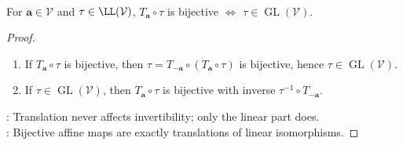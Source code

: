 \begin{corollary} \label{cor:affine-map-bijective-linear-part} \\
For $\mathbf{a}\in\mathcal{V}$ and $\tau\in\LL(\mathcal{V})$, $T_{\mathbf{a}}\circ\tau$ is bijective $\iff$ $\tau\in\operatorname{GL}(\mathcal{V})$.
\begin{proof}
\begin{enumerate}[label=\roman*.]
\setlength{\itemsep}{0pt}
\item[$(\Rightarrow)$] If $T_{\mathbf{a}}\circ\tau$ is bijective, then $\tau=T_{-\mathbf{a}}\circ(T_{\mathbf{a}}\circ\tau)$ is bijective, hence $\tau\in\operatorname{GL}(\mathcal{V})$.
\item[$(\Leftarrow)$] If $\tau\in\operatorname{GL}(\mathcal{V})$, then $T_{\mathbf{a}}\circ\tau$ is bijective with inverse $\tau^{-1}\circ T_{-\mathbf{a}}$.
\end{enumerate}
: Translation never affects invertibility; only the linear part does.\\
: Bijective affine maps are exactly translations of linear isomorphisms.
\end{proof}
\end{corollary}

